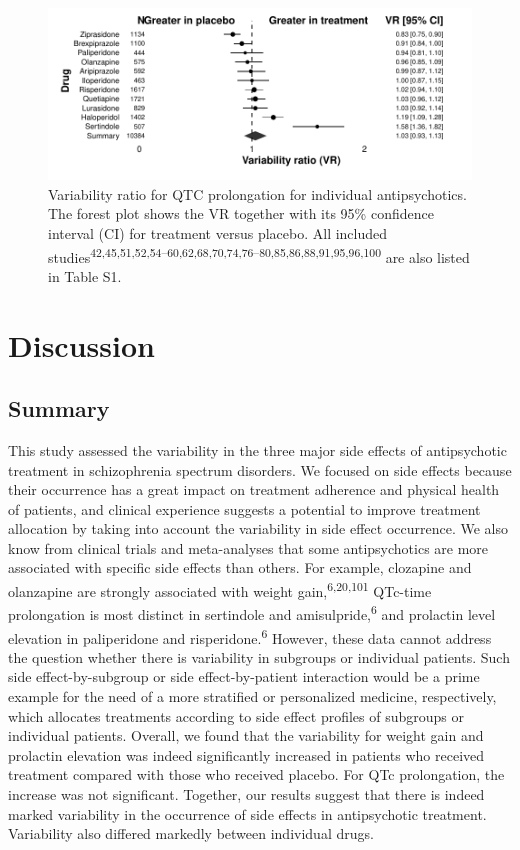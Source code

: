 \documentclass[
  9pt,
  english,
  ,jou,floatsintext]{apa6}
\begin{document}
\begin{figure}
\centering
\includegraphics{../output/figures/qtcsd_fig2.pdf}
\caption{\label{fig:fig6}Variability ratio for QTC prolongation for individual
antipsychotics. The forest plot shows the VR together with its 95\%
confidence interval (CI) for treatment versus placebo. All included studies\textsuperscript{42,45,51,52,54--60,62,68,70,74,76--80,85,86,88,91,95,96,100}
are also listed in Table S1.}
\end{figure}

\hypertarget{discussion}{%
\section{Discussion}\label{discussion}}

\hypertarget{summary}{%
\subsection{Summary}\label{summary}}

This study assessed the variability in the three major side effects of
antipsychotic treatment in schizophrenia spectrum disorders. We
focused on side effects because their occurrence has a great impact on
treatment adherence and physical health of patients, and clinical
experience suggests a potential to improve treatment allocation by
taking into account the variability in side effect occurrence. We also
know from clinical trials and meta-analyses that some antipsychotics
are more associated with specific side effects than others. For
example, clozapine and olanzapine are strongly associated with weight
gain,\textsuperscript{6,20,101} QTc-time prolongation is
most distinct in sertindole and amisulpride,\textsuperscript{6} and prolactin
level elevation in paliperidone and risperidone.\textsuperscript{6} However,
these data cannot address the question whether there is variability in
subgroups or individual patients. Such side effect-by-subgroup or side
effect-by-patient interaction would be a prime example for the need of
a more stratified or personalized medicine, respectively, which
allocates treatments according to side effect profiles of subgroups or
individual patients. Overall, we found that the variability for weight
gain and prolactin elevation was indeed significantly increased in
patients who received treatment compared with those who received
placebo. For QTc prolongation, the increase was not
significant. Together, our results suggest that there is indeed marked
variability in the occurrence of side effects in antipsychotic
treatment. Variability also differed markedly between individual drugs.
\end{document}
